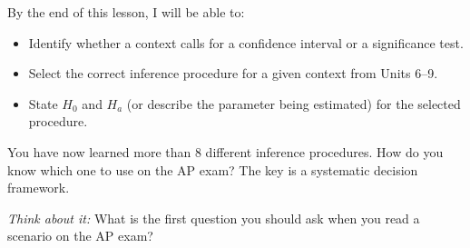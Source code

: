 \documentclass[10pt]{article}
\begin{document}
\namedateperiod

\vspace{0.1in}

\begin{objectivebox}
By the end of this lesson, I will be able to:
\begin{itemize}
    \item[$\square$] Identify whether a context calls for a confidence interval or a significance test.
    \item[$\square$] Select the correct inference procedure for a given context from Units 6--9.
    \item[$\square$] State $H_0$ and $H_a$ (or describe the parameter being estimated) for the selected procedure.
\end{itemize}
\end{objectivebox}

\begin{vocabbox}
\end{vocabbox}

\begin{hookbox}
You have now learned more than 8 different inference procedures. How do you know which one to use on the AP exam? The key is a systematic decision framework.

\textit{Think about it:} What is the first question you should ask when you read a scenario on the AP exam? 
\end{hookbox}
\end{document}
